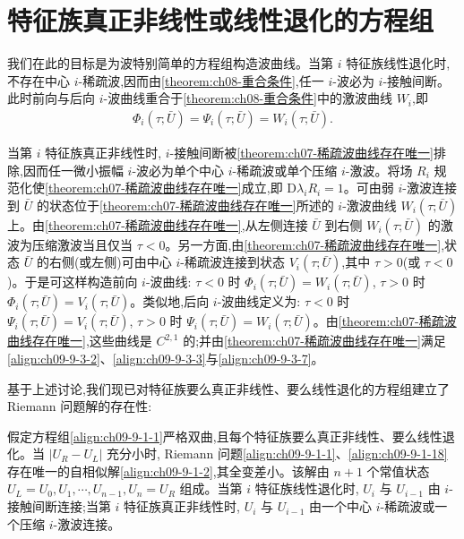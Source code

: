 \documentclass[../../main.tex]{subfiles}
\begin{document}
\section{特征族真正非线性或线性退化的方程组}\label{section:ch09-真正非线性或线性退化方程组}

我们在此的目标是为波特别简单的方程组构造波曲线。当第 $i$ 特征族线性退化时,不存在中心 $i$-稀疏波,因而由\cref{theorem:ch08-重合条件},任一 $i$-波必为 $i$-接触间断。此时前向与后向 $i$-波曲线重合于\cref{theorem:ch08-重合条件}中的激波曲线 $W_{i}$,即
\begin{align}
\Phi_{i}(\tau;\bar{U})=\Psi_{i}(\tau;\bar{U})=W_{i}(\tau;\bar{U}).\nonumber
\end{align}

当第 $i$ 特征族真正非线性时, $i$-接触间断被\cref{theorem:ch07-稀疏波曲线存在唯一}排除,因而任一微小振幅 $i$-波必为单个中心 $i$-稀疏波或单个压缩 $i$-激波。将场 $R_{i}$ 规范化使\cref{theorem:ch07-稀疏波曲线存在唯一}成立,即 $\mathrm{D}\lambda_{i}R_{i}=1$。可由弱 $i$-激波连接到 $\bar{U}$ 的状态位于\cref{theorem:ch07-稀疏波曲线存在唯一}所述的 $i$-激波曲线 $W_{i}(\tau;\bar{U})$ 上。由\cref{theorem:ch07-稀疏波曲线存在唯一},从左侧连接 $\bar{U}$ 到右侧 $W_{i}(\tau;\bar{U})$ 的激波为压缩激波当且仅当 $\tau<0$。另一方面,由\cref{theorem:ch07-稀疏波曲线存在唯一},状态 $\bar{U}$ 的右侧(或左侧)可由中心 $i$-稀疏波连接到状态 $V_{i}(\tau;\bar{U})$,其中 $\tau>0$(或 $\tau<0$)。于是可这样构造前向 $i$-波曲线: $\tau<0$ 时 $\Phi_{i}(\tau;\bar{U})=W_{i}(\tau;\bar{U})$, $\tau>0$ 时 $\Phi_{i}(\tau;\bar{U})=V_{i}(\tau;\bar{U})$。类似地,后向 $i$-波曲线定义为: $\tau<0$ 时 $\Psi_{i}(\tau;\bar{U})=V_{i}(\tau;\bar{U})$, $\tau>0$ 时 $\Psi_{i}(\tau;\bar{U})=W_{i}(\tau;\bar{U})$。由\cref{theorem:ch07-稀疏波曲线存在唯一},这些曲线是 $C^{2,1}$ 的;并由\cref{theorem:ch07-稀疏波曲线存在唯一}满足\eqref{align:ch09-9-3-2}、\eqref{align:ch09-9-3-3}与\eqref{align:ch09-9-3-7}。

基于上述讨论,我们现已对特征族要么真正非线性、要么线性退化的方程组建立了 Riemann 问题解的存在性:

\begin{theorem}\label{theorem:ch09-小振幅riemann解}
假定方程组\eqref{align:ch09-9-1-1}严格双曲,且每个特征族要么真正非线性、要么线性退化。当 $|U_{R}-U_{L}|$ 充分小时, Riemann 问题\eqref{align:ch09-9-1-1}、\eqref{align:ch09-9-1-18}存在唯一的自相似解\eqref{align:ch09-9-1-2},其全变差小。该解由 $n+1$ 个常值状态 $U_{L}=U_{0},U_{1},\cdots ,U_{n-1},U_{n}=U_{R}$ 组成。当第 $i$ 特征族线性退化时, $U_{i}$ 与 $U_{i-1}$ 由 $i$-接触间断连接;当第 $i$ 特征族真正非线性时, $U_{i}$ 与 $U_{i-1}$ 由一个中心 $i$-稀疏波或一个压缩 $i$-激波连接。
\end{theorem}
\end{document}
